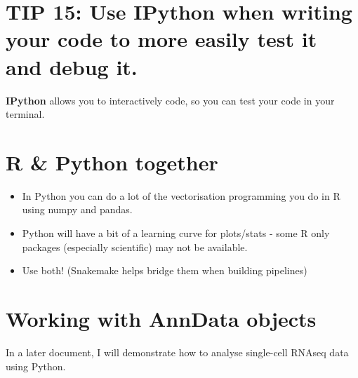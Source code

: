 \documentclass[
  letterpaper,
  DIV=11,
  numbers=noendperiod]{scrartcl}
\begin{document}
\section{TIP 15: Use IPython when writing your code to more easily test
it and debug
it.}\label{tip-15-use-ipython-when-writing-your-code-to-more-easily-test-it-and-debug-it.}

\textbf{IPython} allows you to interactively code, so you can test your
code in your terminal.

\section{R \& Python together}\label{r-python-together}

\begin{itemize}
\item
  In Python you can do a lot of the vectorisation programming you do in
  R using numpy and pandas.
\item
  Python will have a bit of a learning curve for plots/stats - some R
  only packages (especially scientific) may not be available.
\item
  Use both! (Snakemake helps bridge them when building pipelines)
\end{itemize}

\section{Working with AnnData
objects}\label{working-with-anndata-objects}

In a later document, I will demonstrate how to analyse single-cell
RNAseq data using Python.
\end{document}
